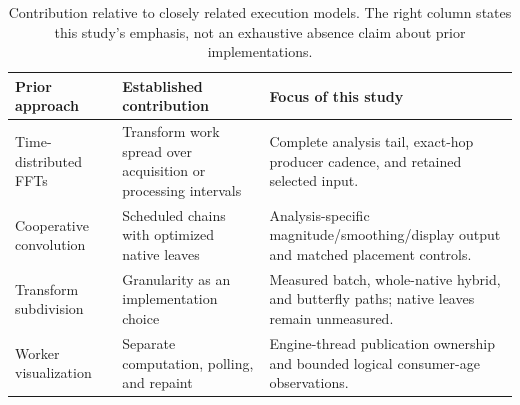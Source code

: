 \begin{table}[htbp]
\centering\small
\begin{tabular}{@{}p{.26\linewidth}p{.31\linewidth}p{.35\linewidth}@{}}
\toprule
Prior approach & Established contribution & Focus of this study \\
\midrule
Time-distributed FFTs~\cite{hurchalla2010,lo1999} & Transform work spread over acquisition or processing intervals & Complete analysis tail, exact-hop producer cadence, and retained selected input. \\
Cooperative convolution~\cite{battenberg2011} & Scheduled chains with optimized native leaves & Analysis-specific magnitude/smoothing/display output and matched placement controls. \\
Transform subdivision~\cite{wefers2015} & Granularity as an implementation choice & Measured batch, whole-native hybrid, and butterfly paths; native leaves remain unmeasured. \\
Worker visualization~\cite{prusa2016} & Separate computation, polling, and repaint & Engine-thread publication ownership and bounded logical consumer-age observations. \\
\bottomrule
\end{tabular}
\caption{Contribution relative to closely related execution models. The
right column states this study's emphasis, not an exhaustive absence claim
about prior implementations.}
\label{tab:contribution-delta}
\end{table}
